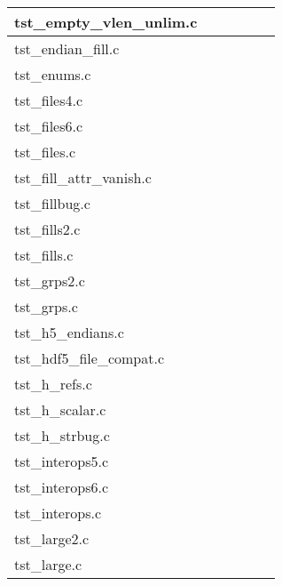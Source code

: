 \begin{table}[H]
\begin{tabular}{|l|c|c|c|c|c|}
tst\_empty\_vlen\_unlim.c   &   &   &   &   &   \\ \hline
tst\_endian\_fill.c   &   &   &   &   &   \\ \hline
tst\_enums.c   &   &   &   &   &   \\ \hline
tst\_files4.c   &   &   &   &   &   \\ \hline
tst\_files6.c   &   &   &   &   &   \\ \hline
tst\_files.c   &   &   &   &   &   \\ \hline
tst\_fill\_attr\_vanish.c   &   &   &   &   &   \\ \hline
tst\_fillbug.c   &   &   &   &   &   \\ \hline
tst\_fills2.c   &   &   &   &   &   \\ \hline
tst\_fills.c   &   &   &   &   &   \\ \hline
tst\_grps2.c   &   &   &   &   &   \\ \hline
tst\_grps.c   &   &   &   &   &   \\ \hline
tst\_h5\_endians.c   &   &   &   &   &   \\ \hline
tst\_hdf5\_file\_compat.c   &   &   &   &   &   \\ \hline
tst\_h\_refs.c   &   &   &   &   &   \\ \hline
tst\_h\_scalar.c   &   &   &   &   &   \\ \hline
tst\_h\_strbug.c   &   &   &   &   &   \\ \hline
tst\_interops5.c   &   &   &   &   &   \\ \hline
tst\_interops6.c   &   &   &   &   &   \\ \hline
tst\_interops.c   &   &   &   &   &   \\ \hline
tst\_large2.c   &   &   &   &   &   \\ \hline
tst\_large.c   &   &   &   &   &   \\ \hline
\hline
\end{tabular}
\caption{}
\end{table}

\clearpage

